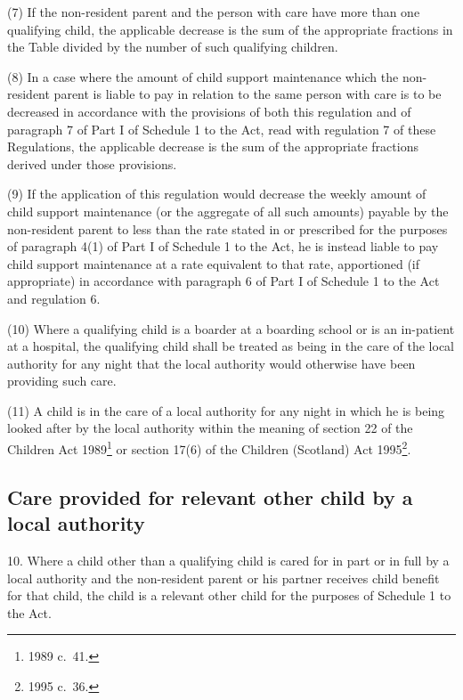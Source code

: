 \documentclass[12pt,a4paper]{article}
\begin{document}
(7) If the non-resident parent and the person with care have more than one qualifying child, the applicable decrease is the sum of the appropriate fractions in the Table divided by the number of such qualifying children.

(8) In a case where the amount of child support maintenance which the non-resident parent is liable to pay in relation to the same person with care is to be decreased in accordance with the provisions of both this regulation and of paragraph 7 of Part I of Schedule 1 to the Act, read with regulation 7 of these Regulations, the applicable decrease is the sum of the appropriate fractions derived under those provisions.

\begin{sloppypar}
(9) If the application of this regulation would decrease the weekly amount of child support maintenance (or the aggregate of all such amounts) payable by the non-resident parent to less than the rate stated in or prescribed for the purposes of paragraph 4(1) of Part I of Schedule 1 to the Act, he is instead liable to pay child support maintenance at a rate equivalent to that rate, apportioned (if appropriate) in accordance with paragraph 6 of Part I of Schedule 1 to the Act and regulation 6.
\end{sloppypar}

(10) Where a qualifying child is a boarder at a boarding school or is an in-patient at a hospital, the qualifying child shall be treated as being in the care of the local authority for any night that the local authority would otherwise have been providing such care.

(11) A child is in the care of a local authority for any night in which he is being looked after by the local authority within the meaning of section 22 of the Children Act 1989\footnote{1989 c.\ 41.} or section 17(6) of the Children (Scotland) Act 1995\footnote{1995 c.\ 36.}.

\subsection[10. Care provided for relevant other child by a local authority]{Care provided for relevant other child by a local authority}

10.  Where a child other than a qualifying child is cared for in part or in full by a local authority and the non-resident parent or his partner receives child benefit for that child, the child is a relevant other child for the purposes of Schedule 1 to the Act.
\end{document}
